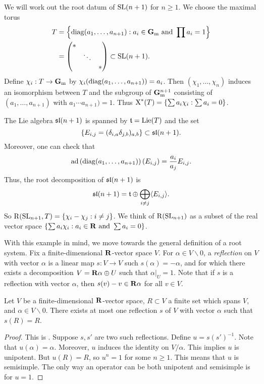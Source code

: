 \begin{example}\label{eg:root-sln}
We will work out the root datum of $\operatorname{SL}(n+1)$ for $n\geqslant 1$. We choose 
the maximal torus 
\begin{align*}
  T &= \left\{\operatorname{diag}(a_1,\dots,a_{n+1}):a_i\in \mathbf{G}_\mathrm{m}\text{ and }\prod a_i=1\right\} \\
  &= \begin{pmatrix} \ast \\ & \ddots \\ & & \ast \end{pmatrix} \subset \operatorname{SL}(n+1) .
\end{align*}
Define $\chi_i:T\to \mathbf{G}_\mathrm{m}$ by $\chi_i(\operatorname{diag}(a_1,\dots,a_{n+1}))=a_i$. Then 
$(\chi_1,\dots,\chi_n)$ induces an isomorphism between $T$ and the subgroup of 
$\mathbf{G}_\mathrm{m}^{n+1}$ consisting of $(a_1,\dots,a_{n+1})$ with $a_1\dotsm a_{n+1})=1$. 
Thus $\operatorname{X}^\ast(T)=\{\sum a_i \chi_i:\sum a_i=0\}$. 

The Lie algebra $\mathfrak{sl}(n+1)$ is spanned by $\mathfrak{t}=\operatorname{Lie}(T)$ and the set 
\[
  \left\{E_{i,j} = (\delta_{i,a}\delta_{j,b})_{a,b}\right\} \subset \mathfrak{sl}(n+1) .
\]
Moreover, one can check that 
\[
  \operatorname{ad}\left(\operatorname{diag}(a_1,\dots,a_{n+1})\right)(E_{i,j}) = \frac{a_i}{a_j} E_{i,j} .
\]
Thus, the root decomposition of $\mathfrak{sl}(n+1)$ is 
\[
  \mathfrak{sl}(n+1) = \mathfrak{t}\oplus \bigoplus_{i\ne j} \langle E_{i,j}\rangle .
\]
So $\operatorname{R}(\operatorname{SL}_{n+1},T) = \{\chi_i-\chi_j:i\ne j\}$. We think 
of $\operatorname{R}(\operatorname{SL}_{n+1})$ as a subset of the real vector space 
$\{\sum a_i \chi_i:a_i\in \mathbf{R}\text{ and }\sum a_i=0\}$. 
\end{example}

With this example in mind, we move towards the general definition of a root 
system. Fix a finite-dimensional $\mathbf{R}$-vector space $V$. For 
$\alpha\in V\smallsetminus 0$, a \emph{reflection} on $V$ with vector $\alpha$ 
is a linear map $s:V\to V$ such $s(\alpha)=-\alpha$, and for which there exists 
a decomposition $V=\mathbf{R}\alpha\oplus U$ such that $\alpha|_U=1$. Note that if 
$s$ is a reflection with vector $\alpha$, then $s(v)-v\in \mathbf{R}\alpha$ for all 
$v\in V$. 

\begin{lemma}
Let $V$ be a finite-dimensional $\mathbf{R}$-vector space, $R\subset V$ a finite 
set which spans $V$, and $\alpha\in V\smallsetminus 0$. There exists at most 
one reflection $s$ of $V$ with vector $\alpha$ such that $s(R)=R$. 
\end{lemma}
\begin{proof}
This is \cite[VI \S 1.1 lem.1]{bourbaki-lie-alg-4-6}. 
Suppose $s,s'$ are two such reflections. Define $u=s (s')^{-1}$. Note that 
$u(\alpha)=\alpha$. Moreover, $u$ induces the identity on $V/\alpha$. This 
implies $u$ is unipotent. But $u(R)=R$, so $u^n=1$ for some $n\geqslant 1$. 
This means that $u$ is semisimple. The only way an operator can be both 
unipotent and semisimple is for $u=1$. 
\end{proof}

